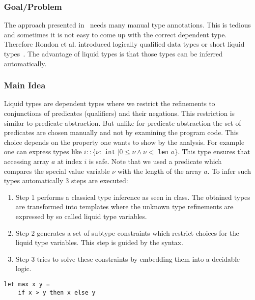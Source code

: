 \documentclass[a4paper,UKenglish]{lipics-v2016}
\begin{document}
\subsubsection{Goal/Problem}
The approach presented in~\cite{Xi:1998:EAB} needs many manual type annotations.
This is tedious and sometimes it is not easy to come up with the correct dependent type.
Therefore Rondon et al. introduced logically qualified data types or short liquid types~\cite{Rondon:2008:LT}.
The advantage of liquid types is that those types can be inferred automatically.

\subsubsection{Main Idea}

Liquid types are dependent types where we restrict the refinements to conjunctions of predicates (qualifiers) and their negations.
This restriction is similar to predicate abstraction.
But unlike for predicate abstraction the set of predicates are chosen manually and not by examining the program code.
This choice depends on the property one wants to show by the analysis.
For example one can express types like $i:: \{\nu:$ \lstinline{int} $\mid 0 \le \nu \land \nu <$ \lstinline{len} $a\}$.
This type ensures that accessing array $a$ at index $i$ is safe.
Note that we used a predicate which compares the special value variable $\nu$ with the length of the array $a$.
To infer such types automatically 3 steps are executed:
\begin{enumerate}
    \item Step 1 performs a classical type inference as seen in class.
        The obtained types are transformed into templates where the unknown type refinements are expressed by so called liquid type variables.
    \item Step 2 generates a set of subtype constraints which restrict choices for the liquid type variables.
        This step is guided by the syntax.
    \item Step 3 tries to solve these constraints by embedding them into a decidable logic.
\end{enumerate}


\begin{lstlisting}[caption={Example Program},label=lst:exmpl,captionpos=t,float,abovecaptionskip=-\medskipamount]
let max x y =
    if x > y then x else y
\end{lstlisting}
\end{document}
